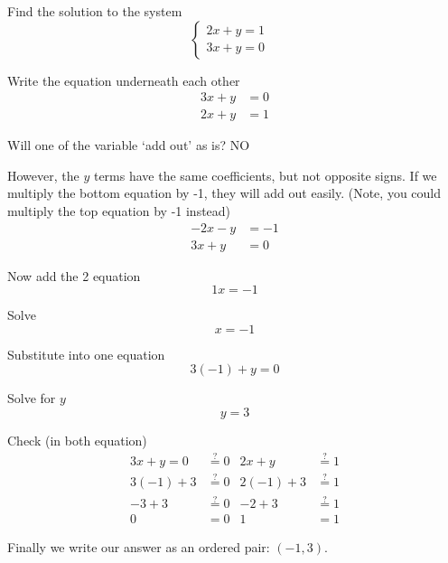 \begin{myexample}
Find the solution to the system
\[
	\begin{cases}
		2x+y  =1 &   \\
		3x+y  =0 &   
	\end{cases}
\]
\end{myexample}
\begin{myProof}
	\begin{steps}
		\item Write the equation underneath each other
		\begin{align*}
			3x+y & =0 \\
			2x+y & =1 
		\end{align*} 
		\item Will one of the variable `add out' as is? {\color{red} NO}
		\item However, the $y$ terms have the same coefficients, but not opposite signs. If we
		multiply the bottom equation by -1, they will add out easily. (Note, you could multiply the top equation
		by -1 instead)
		\begin{align*}
			-2x-y & =	-1 \\
			3x+y  & =	0  
		\end{align*} 
		\item Now add the 2 equation
		\[
			1x = -1
		\]	
																																																																						
		\item Solve
		\[
			x = -1
		\]
		\item Substitute into one equation
		\[
			3(-1)+y=0
		\]
		\item Solve for $y$
		\[
			y=3
		\]
		\item Check (in both equation)
		\begin{align*}
			3x+y=0  & \stackrel{?}{=} 0 & 2x+y    & \stackrel{?}{=}	 1 \\
			3(-1)+3 & \stackrel{?}{=} 0 & 2(-1)+3 & \stackrel{?}{=}	 1 \\
			-3+3    & \stackrel{?}{=} 0 & -2+3    & \stackrel{?}{=}	 1 \\
			0       & =  0              & 1       & =			 1             
		\end{align*} 
		\item Finally we write our answer as an ordered pair: $(-1,3)$.
	\end{steps} 
\end{myProof}
																																																	
